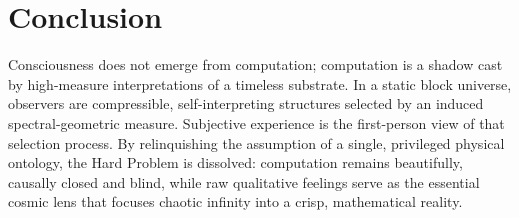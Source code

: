 \documentclass[11pt]{article}
\begin{document}
\section{Conclusion}
Consciousness does not emerge from computation; computation is a shadow cast by high-measure interpretations of a timeless substrate. In a static block universe, observers are compressible, self-interpreting structures selected by an induced spectral-geometric measure. Subjective experience is the first-person view of that selection process. By relinquishing the assumption of a single, privileged physical ontology, the Hard Problem is dissolved: computation remains beautifully, causally closed and blind, while raw qualitative feelings serve as the essential cosmic lens that focuses chaotic infinity into a crisp, mathematical reality.


\end{document}
